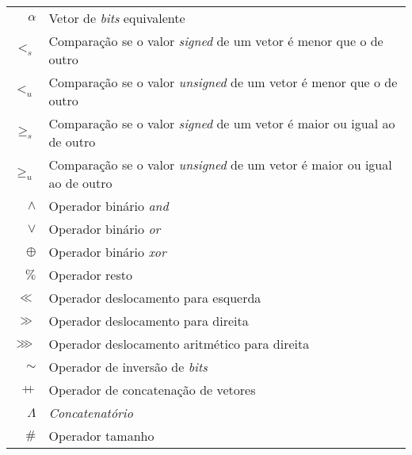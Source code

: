     \begin{tabular}{rl}
      $\alpha$ & Vetor de \emph{bits} equivalente\\
      $<_s$ & Comparação se o valor \emph{signed} de um vetor é menor que o de outro\\
      $<_u$ & Comparação se o valor \emph{unsigned} de um vetor é menor que o de outro\\
      $\geq_s$ & Comparação se o valor \emph{signed} de um vetor é maior ou igual ao de outro\\
      $\geq_u$ & Comparação se o valor \emph{unsigned} de um vetor é maior ou igual ao de outro\\
      $\land$ & Operador binário \emph{and}\\
      $\lor$ & Operador binário \emph{or}\\
      $\oplus$ & Operador binário \emph{xor}\\
      $\%$ & Operador resto \\
      $\ll$ & Operador deslocamento para esquerda \\
      $\gg$ & Operador deslocamento para direita \\
      $\ggg$ & Operador deslocamento aritmético para direita \\
      $\sim$ & Operador de inversão de \emph{bits} \\
      $+\!\!+$ & Operador de concatenação de vetores \\
      $\Lambda$ & \emph{Concatenatório} \\
      $\#$ & Operador tamanho \\
    \end{tabular}
    
    \clearpage
    
    
    \disablenewpage{\listoffigures}
    
    \disablenewpage{\listoftables}
    
    
